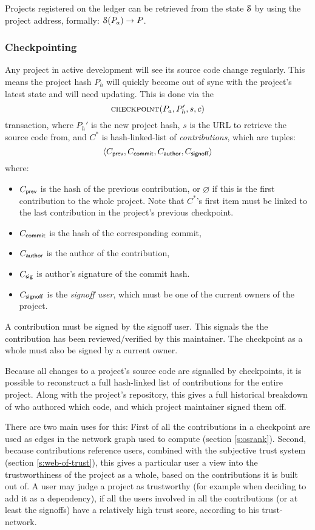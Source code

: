 Projects registered on the ledger can be retrieved from the state $\mathcal{S}$ by
using the project address, formally: $\mathcal{S}(P_a) \to P$.

\subsubsection{Checkpointing} Any project in active development will see its
source code change regularly. This means the project hash $P_h$ will quickly
become out of sync with the project's latest state and will need updating. This
is done via the
\[
    \text{\normalfont\scshape checkpoint}\small{\lparen P_a, P_h', s, c\rparen}
\]
transaction, where $P_h'$ is the new project hash, $s$ is the URL to
retrieve the source code from, and $C^*$ is hash-linked-list of
\emph{contributions}, which are tuples:
\[
   \langle C_{\mathsf{prev}}, C_{\mathsf{commit}}, C_{\mathsf{author}}, C_{\mathsf{signoff}}\rangle
\]
where:
\begin{itemize}
\item $C_{\mathsf{prev}}$ is the hash of the previous contribution, or
  $\varnothing$ if this is the first contribution to the whole
  project. Note that $C^*$'s first item must be linked to the last
  contribution in the project's previous checkpoint.
\item $C_{\mathsf{commit}}$ is the hash of the corresponding commit,
\item $C_{\mathsf{author}}$ is the author of the contribution,
\item $C_{\mathsf{sig}}$ is author's signature of the commit hash. 
\item $C_{\mathsf{signoff}}$ is the \emph{signoff user}, which must be
  one of the current owners of the project.
\end{itemize}
A contribution must be signed by the signoff user. This signals the
the contribution has been reviewed/verified by this maintainer. The
checkpoint as a whole must also be signed by a current owner.

Because all changes to a project's source code are signalled by
checkpoints, it is possible to reconstruct a full hash-linked list of
contributions for the entire project. Along with the project's
repository, this gives a full historical breakdown of who authored
which code, and which project maintainer signed them off.

There are two main uses for this: First of all the contributions in a
checkpoint are used as edges in the network graph used to compute
\osrank{} (section \ref{s:osrank}).  Second, because contributions
reference users, combined with the subjective trust system (section
\ref{s:web-of-trust}), this gives a particular user a view into the
trustworthiness of the project as a whole, based on the contributions
it is built out of. A user may judge a project as trustworthy (for
example when deciding to add it as a dependency), if all the users
involved in all the contributions (or at least the signoffs) have a
relatively high trust score, according to his trust-network.

